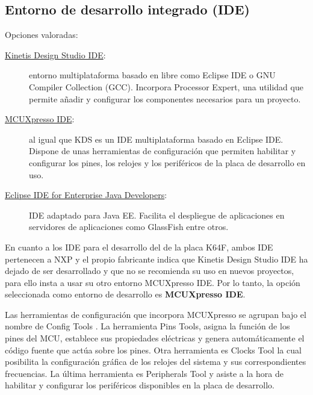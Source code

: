 \subsection{Entorno de desarrollo integrado (IDE)}{\label{sec:ide}}
Opciones valoradas:
\begin{description}
  \item[\href{https://www.nxp.com/support/developer-resources/evaluation-and-development-boards/freedom-development-boards/mcu-boards/kinetis-design-studio-integrated-development-environment-ide:KDS_IDE}
  {Kinetis Design Studio IDE}:] entorno multiplataforma basado en
   libre como Eclipse IDE o GNU Compiler Collection
  (GCC). Incorpora Processor Expert, una utilidad que permite añadir y
  configurar los componentes necesarios para un proyecto.
  \item[\href{https://www.nxp.com/support/developer-resources/software-development-tools/mcuxpresso-software-and-tools/mcuxpresso-integrated-development-environment-ide:MCUXpresso-IDE}
  {MCUXpresso IDE}:]al igual que KDS es un IDE multiplataforma basado en Eclipse
  IDE. Dispone de unas herramientas de configuración que permiten habilitar y
  configurar los pines, los relojes y los periféricos de la placa de desarrollo
  en uso.
  \item[\href{https://www.eclipse.org/downloads/packages/release/2018-12/r/eclipse-ide-enterprise-java-developers}
  {Eclipse IDE for Enterprise Java Developers}:] IDE adaptado para Java EE.
  Facilita el despliegue de aplicaciones en servidores de aplicaciones como
  GlassFish entre otros.
\end{description}

En cuanto a los IDE para el desarrollo del  de la placa
K64F, ambos IDE pertenecen a NXP y el propio fabricante indica que Kinetis Design
Studio IDE ha dejado de ser desarrollado y que no se recomienda su uso en nuevos
proyectos, para ello insta a usar su otro entorno MCUXpresso IDE. Por lo tanto,
la opción seleccionada como entorno de desarrollo es \textbf{MCUXpresso IDE}.

Las herramientas de configuración que incorpora MCUXpresso se agrupan bajo el
nombre de Config Tools \cite{webpage:config-tools}. La herramienta Pins Tools,
asigna la función de los pines del MCU, establece sus propiedades eléctricas y
genera automáticamente el código fuente que actúa sobre los pines. Otra
herramienta es Clocks Tool la cual posibilita la configuración gráfica de los
relojes del sistema y sus correspondientes frecuencias. La última herramienta es
Peripherals Tool y asiste a la hora de habilitar y configurar los periféricos
disponibles en la placa de desarrollo.

